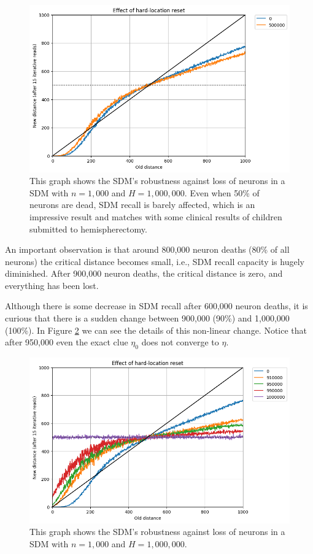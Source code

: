 \begin{figure}[!p]
\centering\includegraphics[width=\textwidth]{./images02/new-images/sdm-neuron-death-500k.png}
\caption{This graph shows the SDM's robustness against loss of neurons in a SDM with $n=1,000$ and $H=1,000,000$. Even when 50\% of neurons are dead, SDM recall is barely affected, which is an impressive result and matches with some clinical results of children submitted to hemispherectomy.
\label{fig:sdm-neuron-death-500k}}
\end{figure}

An important observation is that around 800,000 neuron deaths (80\% of all neurons) the critical distance becomes small, i.e., SDM recall capacity is hugely diminished. After 900,000 neuron deaths, the critical distance is zero, and everything has been lost.

Although there is some decrease in SDM recall after 600,000 neuron deaths, it is curious that there is a sudden change between 900,000 (90\%) and 1,000,000 (100\%). In Figure \ref{fig:sdm-neuron-death-details} we can see the details of this non-linear change. Notice that after 950,000 even the exact clue $\eta_0$ does not converge to $\eta$.

\begin{figure}[!p]
\centering\includegraphics[width=\textwidth]{images02/new-images/sdm-neuron-death.png}
\caption{This graph shows the SDM's robustness against loss of neurons in a SDM with $n=1,000$ and $H=1,000,000$.
\label{fig:sdm-neuron-death-details}}
\end{figure}

